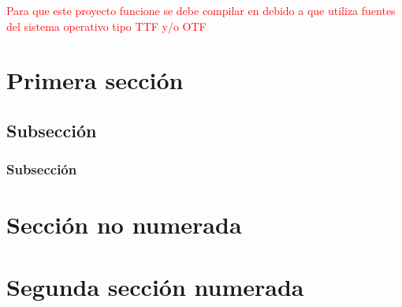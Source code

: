 \textcolor{red}{Para que este proyecto funcione se debe compilar en \XeLaTeX debido a que utiliza fuentes del sistema operativo tipo \gls{TTF} y/o \gls{OTF}}

\section{Primera sección}
\subsection{Subsección}
\subsubsection{Subsección}

\section*{Sección no numerada}
\section{Segunda sección numerada}